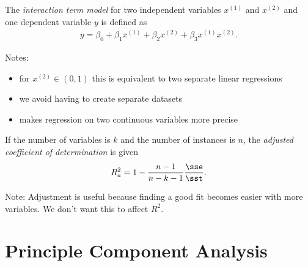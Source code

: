 \documentclass{article}
\begin{document}
\begin{definition}
	The \emph{interaction term model} for two independent variables $x^{(1)}$ and $x^{(2)}$ and one dependent variable $y$
	is defined as
	\begin{align*}
		y = \beta_0 + \beta_1 x^{(1)} + \beta_2 x^{(2)} + \beta_3 x^{(1)}x^{(2)}.
	\end{align*}
\end{definition}
Notes:
\begin{itemize}
	\item for $x^{(2)}\in (0,1)$ this is equivalent to two separate linear regressions
	\item we avoid having to create separate datasets
	\item makes regression on two continuous variables more precise
\end{itemize}
\begin{definition}
	If the number of variables is $k$ and the number of instances is $n$, the
	\emph{adjusted coefficient of determination} is given
	\begin{align*}
		R^2_a = 1 - \frac{n-1}{n-k-1}\frac{\sse}{\sst}.
	\end{align*}
\end{definition}
Note: Adjustment is useful because finding a good fit becomes easier with more variables. We don't want this to affect $R^2$.



\section{Principle Component Analysis}
\end{document}
